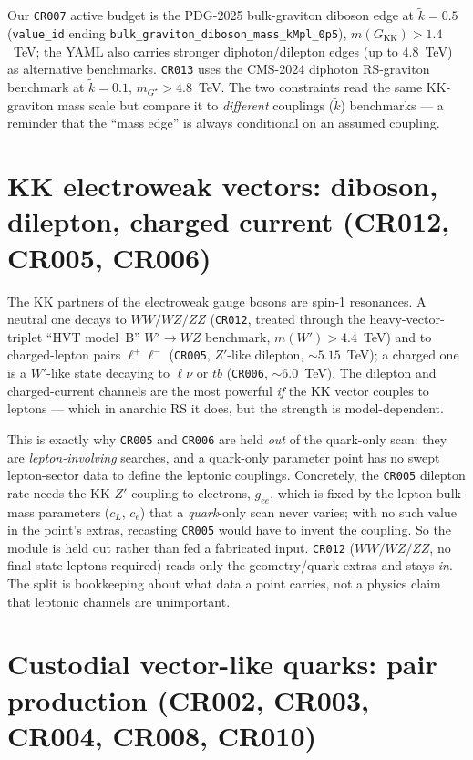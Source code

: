 \documentclass[11pt]{article}
\newcommand{\GKK}{G_{\mathrm{KK}}}
\newcommand{\code}[1]{\texttt{#1}}
\theoremstyle{definition}
\begin{document}
Our \code{CR007} active budget is the PDG-2025 bulk-graviton diboson edge at
$\tilde k = 0.5$ (\code{value\_id} ending \code{bulk\_graviton\_diboson\_mass\_kMpl\_0p5}),
$m(\GKK) > 1.4$~TeV; the YAML also carries stronger diphoton/dilepton edges (up
to $4.8$~TeV) as alternative benchmarks. \code{CR013} uses the CMS-2024 diphoton
RS-graviton benchmark at $\tilde k = 0.1$, $m_{G^\star} > 4.8$~TeV. The two
constraints read the same KK-graviton mass scale but compare it to
\emph{different} couplings ($\tilde k$) benchmarks --- a reminder that the
``mass edge'' is always conditional on an assumed coupling.

\section{KK electroweak vectors: diboson, dilepton, charged current (CR012, CR005, CR006)}
\label{sec:ewkk}

The KK partners of the electroweak gauge bosons are spin-1 resonances. A neutral
one decays to $WW/WZ/ZZ$ (\code{CR012}, treated through the heavy-vector-triplet
``HVT model~B'' $W'\to WZ$ benchmark, $m(W') > 4.4$~TeV) and to charged-lepton
pairs $\ell^+\ell^-$ (\code{CR005}, $Z'$-like dilepton, $\sim 5.15$~TeV); a
charged one is a $W'$-like state decaying to $\ell\nu$ or $tb$ (\code{CR006},
$\sim 6.0$~TeV). The dilepton and charged-current channels are the most powerful
\emph{if} the KK vector couples to leptons --- which in anarchic RS it does, but
the strength is model-dependent.

This is exactly why \code{CR005} and \code{CR006} are held \emph{out} of the
quark-only scan: they are \emph{lepton-involving} searches, and a quark-only
parameter point has no swept lepton-sector data to define the leptonic
couplings. Concretely, the \code{CR005} dilepton rate needs the KK-$Z'$ coupling
to electrons, $g_{ee}$, which is fixed by the lepton bulk-mass parameters
($c_L$, $c_e$) that a \emph{quark}-only scan never varies; with no such value in
the point's extras, recasting \code{CR005} would have to invent the coupling. So
the module is held out rather than fed a fabricated input. \code{CR012}
($WW/WZ/ZZ$, no final-state leptons required) reads only the geometry/quark
extras and stays \emph{in}. The split is bookkeeping about what data a point
carries, not a physics claim that leptonic channels are unimportant.

\section{Custodial vector-like quarks: pair production (CR002, CR003, CR004, CR008, CR010)}
\label{sec:vlq}
\end{document}
